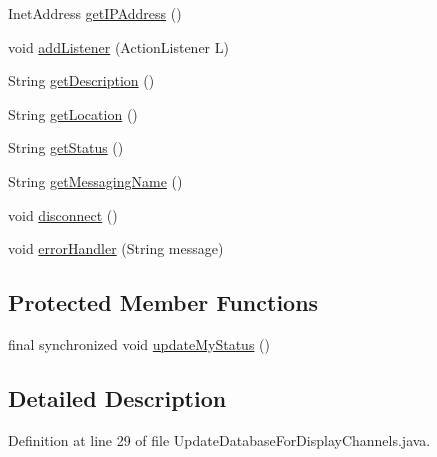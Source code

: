 \begin{DoxyCompactItemize}
\item 
Inet\-Address \hyperlink{classgov_1_1fnal_1_1ppd_1_1dd_1_1display_1_1client_1_1UpdateDatabaseForDisplayChannels_a6ecfe0b5c74a7e574ac3770d7428a2b5}{get\-I\-P\-Address} ()
\item 
void \hyperlink{classgov_1_1fnal_1_1ppd_1_1dd_1_1display_1_1client_1_1UpdateDatabaseForDisplayChannels_a8e5f09fc6cc000ce10a80ee4b19db666}{add\-Listener} (Action\-Listener L)
\item 
String \hyperlink{classgov_1_1fnal_1_1ppd_1_1dd_1_1display_1_1client_1_1UpdateDatabaseForDisplayChannels_afb2e0f2aa3dd741909b329bf7fe743b4}{get\-Description} ()
\item 
String \hyperlink{classgov_1_1fnal_1_1ppd_1_1dd_1_1display_1_1client_1_1UpdateDatabaseForDisplayChannels_a753f8c4ad34a649221a78ad963f44d28}{get\-Location} ()
\item 
String \hyperlink{classgov_1_1fnal_1_1ppd_1_1dd_1_1display_1_1client_1_1UpdateDatabaseForDisplayChannels_a839b068caf40194233bb6040c6a7a29d}{get\-Status} ()
\item 
String \hyperlink{classgov_1_1fnal_1_1ppd_1_1dd_1_1display_1_1client_1_1UpdateDatabaseForDisplayChannels_a6bd0e5cfb4362cd534592faf1df8e381}{get\-Messaging\-Name} ()
\item 
void \hyperlink{classgov_1_1fnal_1_1ppd_1_1dd_1_1display_1_1client_1_1UpdateDatabaseForDisplayChannels_a16818671921624744a8323ef36766517}{disconnect} ()
\item 
void \hyperlink{classgov_1_1fnal_1_1ppd_1_1dd_1_1display_1_1client_1_1UpdateDatabaseForDisplayChannels_aa76c9578b86e1ffed9c4287d3633f821}{error\-Handler} (String message)
\end{DoxyCompactItemize}
\subsection*{Protected Member Functions}
\begin{DoxyCompactItemize}
\item 
final synchronized void \hyperlink{classgov_1_1fnal_1_1ppd_1_1dd_1_1display_1_1client_1_1UpdateDatabaseForDisplayChannels_a1743e409cda7e6d714197c2ec35cdece}{update\-My\-Status} ()
\end{DoxyCompactItemize}


\subsection{Detailed Description}


Definition at line 29 of file Update\-Database\-For\-Display\-Channels.\-java.



